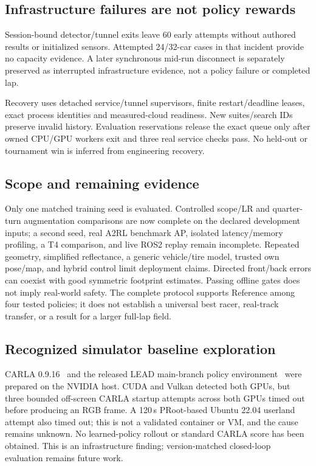 \documentclass[conference]{IEEEtran}
\begin{document}
\subsection{Infrastructure failures are not policy rewards}
Session-bound detector/tunnel exits leave 60 early attempts without authored results or initialized sensors. Attempted 24/32-car cases in that incident provide no capacity evidence. A later synchronous mid-run disconnect is separately preserved as interrupted infrastructure evidence, not a policy failure or completed lap.

Recovery uses detached service/tunnel supervisors, finite restart/deadline leases, exact process identities and measured-cloud readiness. New suites/search IDs preserve invalid history. Evaluation reservations release the exact queue only after owned CPU/GPU workers exit and three real service checks pass. No held-out or tournament win is inferred from engineering recovery.

\subsection{Scope and remaining evidence}
Only one matched training seed is evaluated. Controlled scope/LR and quarter-turn augmentation comparisons are now complete on the declared development inputs; a second seed, real A2RL benchmark AP, isolated latency/memory profiling, a T4 comparison, and live ROS2 replay remain incomplete. Repeated geometry, simplified reflectance, a generic vehicle/tire model, trusted own pose/map, and hybrid control limit deployment claims. Directed front/back errors can coexist with good symmetric footprint estimates. Passing offline gates does not imply real-world safety. The complete protocol supports Reference among four tested policies; it does not establish a universal best racer, real-track transfer, or a result for a larger full-lap field.

\subsection{Recognized simulator baseline exploration}
CARLA 0.9.16~\cite{carla0916} and the released LEAD main-branch policy environment~\cite{nguyen2026lead} were prepared on the NVIDIA host. CUDA and Vulkan detected both GPUs, but three bounded off-screen CARLA startup attempts across both GPUs timed out before producing an RGB frame. A 120\,s PRoot-based Ubuntu 22.04 userland attempt also timed out; this is not a validated container or VM, and the cause remains unknown. No learned-policy rollout or standard CARLA score has been obtained. This is an infrastructure finding; version-matched closed-loop evaluation remains future work.
\end{document}
